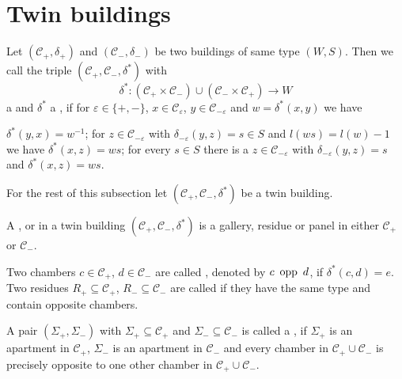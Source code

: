 \section{Twin buildings}

\begin{defi}
	Let $(\mathcal{C}_+, \delta_+)$ and $(\mathcal{C}_-, \delta_-)$ be two buildings of same type $(W,S)$. Then we call the triple $(\mathcal{C}_+,\mathcal{C}_-,\delta^*)$ with
	$$ \delta^* : (\mathcal{C}_+ \times \mathcal{C}_-) \cup (\mathcal{C}_- \times \mathcal{C}_+) \to W $$
	a  and $\delta^*$ a , if for $\varepsilon \in \{+,-\}$, $x \in \mathcal{C}_\varepsilon$, $y \in \mathcal{C}_{-\varepsilon}$ and $w = \delta^*(x,y)$ we have
	\begin{axioms}
		 $\delta^*(y,x) = w^{-1}$;
		 for $z \in \mathcal{C}_{-\varepsilon}$ with $\delta_{-\varepsilon}(y,z) = s \in S$ and $l(ws) = l(w) - 1$ we have $\delta^*(x,z) = ws$;
		 for every $s \in S$ there is a $z \in \mathcal{C}_{-\varepsilon}$ with $\delta_{-\varepsilon}(y,z) = s$ and $\delta^*(x,z) = ws$.
	\end{axioms}
\end{defi}

	For the rest of this subsection let $(\mathcal{C}_+,\mathcal{C}_-,\delta^*)$ be a twin building.

\begin{defi}
	A ,  or  in a twin building $(\mathcal{C}_+,\mathcal{C}_-,\delta^*)$ is a gallery, residue or panel in either $\mathcal{C}_+$ or $\mathcal{C}_-$.
\end{defi}

\begin{defi}
	Two chambers $c \in \mathcal{C}_+$, $d \in \mathcal{C}_-$ are called , denoted by $c \opp d$, if $\delta^*(c,d) = e$. Two residues $R_+ \subseteq \mathcal{C}_+$, $R_- \subseteq \mathcal{C}_-$ are called  if they have the same type and contain opposite chambers.
\end{defi}

\begin{defi}
	A pair $(\Sigma_+,\Sigma_-)$ with $\Sigma_+ \subseteq \mathcal{C}_+$ and $\Sigma_- \subseteq \mathcal{C}_-$ is called a , if $\Sigma_+$ is an apartment in $\mathcal{C}_+$, $\Sigma_-$ is an apartment in $\mathcal{C}_-$ and every chamber in $\mathcal C_+ \cup \mathcal C_-$ is precisely opposite to one other chamber in $\mathcal C_+ \cup \mathcal C_-$.
\end{defi}

